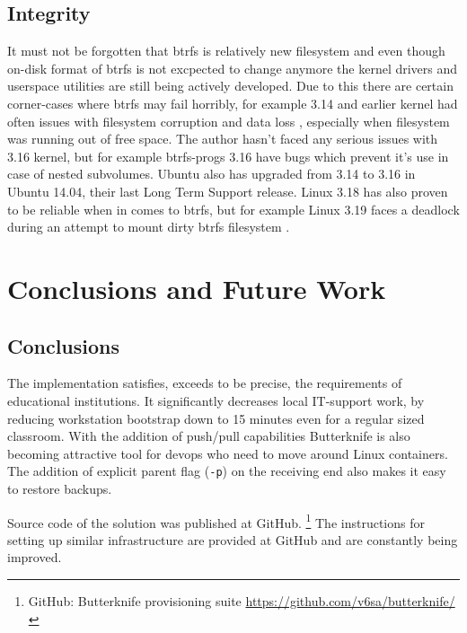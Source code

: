 \documentclass[a4paper,11pt]{kth-mag}
\begin{document}
\section{Integrity}

It must not be forgotten that \acrshort{btrfs} is relatively
new filesystem and even though on-disk format of
\acrshort{btrfs} is not excpected to change anymore
the kernel drivers and userspace utilities are
still being actively developed.
Due to this there are certain corner-cases where
\acrshort{btrfs} may fail horribly,
for example 3.14 and earlier kernel had often issues
with filesystem corruption and data loss
\cite{btrfs-corruption},
especially when filesystem was running out of free space.
The author hasn't faced any serious issues with
3.16 kernel, but for example btrfs-progs 3.16 have
bugs which prevent it's use in case of nested subvolumes.
Ubuntu also has upgraded from 3.14 to 3.16 in Ubuntu 14.04,
their last Long Term Support release.
Linux 3.18 has also proven to be reliable when in comes
to \acrshort{btrfs}, but for example Linux 3.19 faces
a deadlock during an attempt to mount
dirty \acrshort{btrfs} filesystem
\cite{btrfs-dirty-mount-deadlock}.


%
%
%
%

\chapter{Conclusions and Future Work}
\label{chap:conc}


\section{Conclusions}

The implementation satisfies, exceeds to be precise,
the requirements of educational institutions.
It significantly decreases local IT-support work,
by reducing workstation bootstrap down to 15 minutes even for
a regular sized classroom.
With the addition of push/pull capabilities
Butterknife is also becoming attractive tool
for devops who need to move around Linux containers.
The addition of explicit parent flag (\lstinline!-p!) on
the receiving end also makes it easy to
restore backups.

Source code of the solution was published at GitHub.
\footnote{GitHub: Butterknife provisioning suite \url{https://github.com/v6sa/butterknife/}}
The instructions for setting up similar infrastructure
are provided at GitHub and are constantly being improved.
\end{document}
